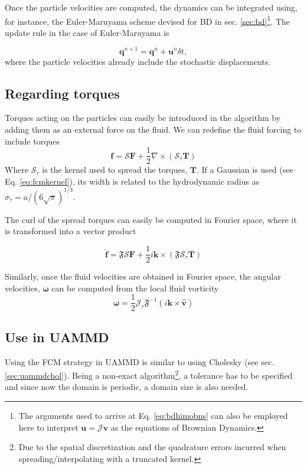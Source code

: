 \documentclass[ twoside,openright,titlepage,numbers=noenddot,%
headinclude,footinclude,cleardoublepage=empty,abstract=on,
BCOR=5mm,paper=b5,fontsize=11pt, dvipsnames
]{scrreprt}
\renewcommand{\vec}[1]{\bm{#1}}
\newcommand{\oper}[1]{\mathcal{#1}}
\newcommand{\uammd}{\gls{UAMMD}\xspace}
\newcommand{\dt}{\delta t}
\newcommand{\half}{\frac{1}{2}}
\newcommand{\fou}[1]{\widehat{#1}}
\newcommand{\ppos}{q}
\newcommand{\pvel}{u}
\newcommand{\fvel}{v}
\begin{document}
Once the particle velocities are computed, the dynamics can be integrated using, for instance, the Euler-Maruyama scheme devised for \gls{BD} in sec. \ref{sec:bd}\footnote{The arguments used to arrive at Eq. \eqref{eq:bdhimobns} can also be employed here to interpret $\vec{\pvel}=\oper{J}\vec{\fvel}$ as the equations of Brownian Dynamics.}. The update rule in the case of Euler-Maruyama is

\begin{equation}
  \label{eq:fcmupdate}
  \vec{\ppos}^{n+1} = \vec{\ppos}^n + \vec{\pvel}^n\dt,
\end{equation}
where the particle velocities already include the stochastic displacements.

\subsection*{Regarding torques}

Torques acting on the particles can easily be introduced in the algorithm by adding them as an external force on the fluid. We can redefine the fluid forcing to include torques
\begin{equation}
\vec{f} = \oper{S}\vec{F} + \half\nabla\times(\oper{S}_\tau\vec{T})
\end{equation}
Where $\oper{S}_\tau$ is the kernel used to spread the torques, $\vec{T}$. If a Gaussian is used (see Eq. \eqref{eq:fcmkernel}), its width is related to the hydrodynamic radius as $\sigma_\tau = a/(6\sqrt{\pi})^{1/3}$.

The curl of the spread torques can easily be computed in Fourier space, where it is transformed into a vector product

\begin{equation}
\fou{\vec{f}} = \mathfrak{F}\oper{S}\vec{F} + \half i\vec{k}\times(\mathfrak{F}\oper{S}_\tau\vec{T})
\end{equation}

Similarly, once the fluid velocities are obtained in Fourier space, the angular velocities, $\vec{\omega}$ can be computed from the local fluid vorticity
\begin{equation}
  \vec{\omega} = \half\oper{J}_\tau\mathfrak{F}^{-1}\left(i\vec{k}\times\fou{\vec{\fvel}}\right)
\end{equation}


\subsection*{Use in UAMMD}
Using the \gls{FCM} strategy in \uammd is similar to using Cholesky (see sec. \ref{sec:uammdchol}). Being a non-exact algorithm\footnote{Due to the spatial discretization and the quadrature errors incurred when spreading/interpolating with a truncated kernel.}, a tolerance has to be specified and since now the domain is periodic, a domain size is also needed.
\end{document}
